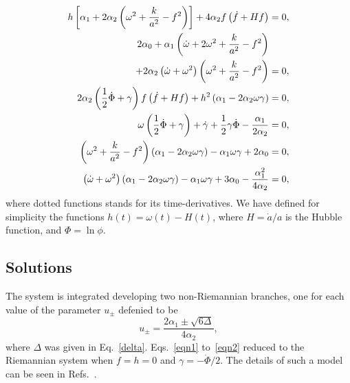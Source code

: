 \documentclass[aps,prd,12pt,superscriptaddress,showpacs,showkeys,longbibliography,reprint]{revtex4-1}
\begin{document}
\begin{align}
  \label{eqn1}
  h\left[\alpha_1+2\alpha_2\left(\omega^2+\frac{k}{a^2}-f^2\right)\right]+4\alpha_2f\left(\dot{f}+Hf\right)&=0,\\
  2\alpha_0+\alpha_1\left(\dot{\omega}+2\omega^2+\frac{k}{a^2}-f^2\right)\notag\\
  +2\alpha_2\left(\dot{\omega}+\omega^2\right)\left(\omega^2+\frac{k}{a^2}-f^2\right)&=0,\\
  2\alpha_2\left(\frac{1}{2}\dot{\Phi}+\gamma\right)f\left(\dot{f}+Hf\right)
  +h^2\left(\alpha_1-2\alpha_2\omega\gamma\right)&=0,\\
  \omega\left(\frac{1}{2}\dot{\Phi}+\gamma\right)+\dot{\gamma}+\frac{1}{2}\gamma\dot{\Phi}-\frac{\alpha_1}{2\alpha_2}&=0,\\
  \left(\omega^2+\frac{k}{a^2}-f^2\right)\left(\alpha_1-2\alpha_2\omega\gamma\right)-\alpha_1\omega\gamma+2\alpha_0&=0,\\
  \label{eqn2}
  \left(\dot{\omega}+\omega^2\right)\left(\alpha_1-2\alpha_2\omega\gamma\right)-\alpha_1
  \omega\gamma+3\alpha_0-\frac{\alpha^2_1}{4\alpha_2}&=0,
\end{align}
where dotted functions stands for its time-derivatives. We have defined for simplicity the functions $h(t)=\omega(t)-H(t)$, where $H=\dot{a}/a$ is the Hubble function, and $\Phi=\ln\phi$.


\subsection{Solutions}

The system is integrated developing two non-Riemannian branches, one for each value of the parameter $u_\pm$ defenied to be
\begin{equation}\label{u}
  u_\pm=\frac{2\alpha_1\pm\sqrt{6\Delta}}{4\alpha_2},
\end{equation}
where $\Delta$ was given in Eq.~\eqref{delta}. Eqs.~\eqref{eqn1} to~\eqref{eqn2} reduced to the Riemannian system when \mbox{$f=h=0$} and \mbox{$\gamma=-\dot{\Phi}/2$}. The details of such a model can be seen in Refs.~\cite{Deruelle:1986iv,Deruelle:2003ck,Henriques:1986jw,Ishihara:1986if,Kleidis:1997mu}.
\end{document}
